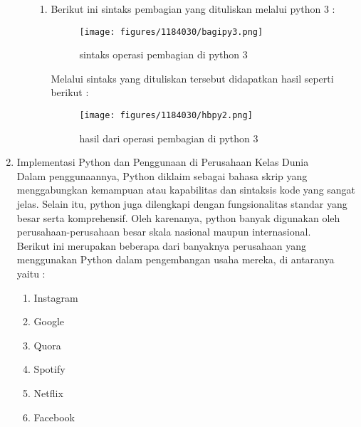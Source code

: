 \begin{enumerate}
\begin{itemize}
\begin{enumerate}
	\item Berikut ini sintaks pembagian yang dituliskan melalui python 3 :
		\hfill \break
			\begin{figure}[H]
			\texttt{[image: figures/1184030/bagipy3.png]}
			\centering
			\caption{sintaks operasi pembagian di python 3}
			\end{figure}
		Melalui sintaks yang dituliskan tersebut didapatkan hasil seperti berikut :
		\hfill \break
			\begin{figure}[H]
			\texttt{[image: figures/1184030/hbpy2.png]}
			\centering
			\caption{hasil dari operasi pembagian di python 3}
			\end{figure}
	\end{enumerate}			
\end{itemize}
	\item Implementasi Python dan Penggunaan di Perusahaan Kelas Dunia\\
	Dalam penggunaannya, Python diklaim sebagai bahasa skrip yang menggabungkan kemampuan atau kapabilitas dan sintaksis kode yang sangat jelas. Selain itu, python juga dilengkapi dengan fungsionalitas standar yang besar serta komprehensif. Oleh karenanya, python banyak digunakan oleh perusahaan-perusahaan besar skala nasional maupun internasional.\\
	Berikut ini merupakan beberapa dari banyaknya perusahaan yang menggunakan Python dalam pengembangan usaha mereka, di antaranya yaitu :
	\begin{enumerate}
		\item Instagram
		\item Google
		\item Quora
		\item Spotify
		\item Netflix
		\item Facebook
	\end{enumerate}

\end{enumerate}
